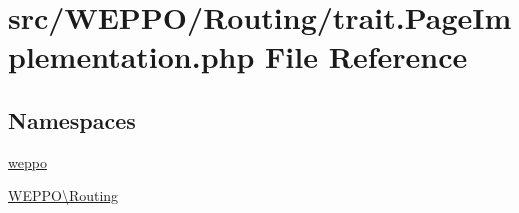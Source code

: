 \hypertarget{trait_8PageImplementation_8php}{}\section{src/\+W\+E\+P\+P\+O/\+Routing/trait.Page\+Implementation.\+php File Reference}
\label{trait_8PageImplementation_8php}
\subsection*{Namespaces}
\begin{DoxyCompactItemize}
\item 
 \hyperlink{namespaceweppo}{weppo}
\item 
 \hyperlink{namespaceWEPPO_1_1Routing}{W\+E\+P\+P\+O\textbackslash{}\+Routing}
\end{DoxyCompactItemize}
